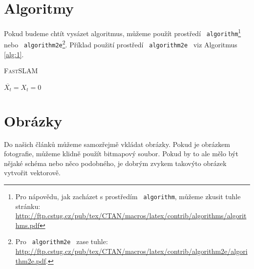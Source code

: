 \documentclass[11pt]{article}
\begin{document}
\section{Algoritmy} \label{sec:3}
Pokud budeme chtít vysázet algoritmus, můžeme použít prostředí \texttt{ algorithm}\footnote{Pro nápovědu, jak zacházet s prostředím \texttt{ algorithm}, můžeme zkusit tuhle stránku: \\
\url{http://ftp.cstug.cz/pub/tex/CTAN/macros/latex/contrib/algorithms/algorithms.pdf}} \quad nebo \texttt{  algorithm2e}\footnote{Pro \texttt{ algorithm2e } zase tuhle:
\url{http://ftp.cstug.cz/pub/tex/CTAN/macros/latex/contrib/algorithm2e/algorithm2e.pdf}.}. 
Příklad použití prostředí \texttt{ algorithm2e } viz Algoritmus \ref{alg:1}.
\bigskip

\begin{algorithm}
\label{alg:1}
\caption{\textsc{Fast}SLAM}
\SetNlSty{}{}{:}
\BlankLine
\Indp\Indpp
\SetNlSkip{-1em}
$\overline{X_t} = X_t = 0$ \\
\end{algorithm}

\section{Obrázky}
Do našich článků můžeme samozřejmě vkládat obrázky. 
Pokud je obrázkem fotografie, můžeme klidně použít bitmapový soubor. 
Pokud by to ale mělo být nějaké schéma nebo něco podobného, je dobrým zvykem takovýto obrázek vytvořit vektorově.
\end{document}
